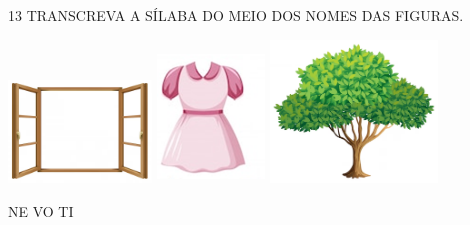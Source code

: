 
\num{13} TRANSCREVA A SÍLABA DO MEIO DOS NOMES DAS FIGURAS.


\includegraphics[width=1.50139in,height=1.07153in]{media/image64.png}
\includegraphics[width=1.12986in,height=1.39097in]{media/image65.png}
\includegraphics[width=1.74752in,height=1.49479in]{media/image66.png}

NE VO TI

